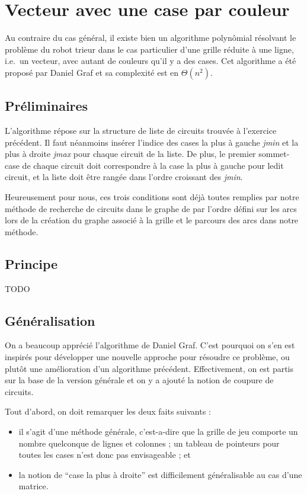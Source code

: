 \documentclass[12pt,a4paper]{article}
\begin{document}
\section{Vecteur avec une case par couleur}
Au contraire du cas g\'en\'eral, il existe bien un algorithme polyn\^omial r\'esolvant
le probl\`eme du robot trieur dans le cas particulier d'une grille r\'eduite \`a une
ligne, i.e.\ un vecteur, avec autant de couleurs qu'il y a des cases. Cet
algorithme a \'et\'e propos\'e par Daniel Graf et sa complexit\'e est en 
$\Theta(n^2)$.

\subsection*{Pr\'eliminaires}
L'algorithme r\'epose sur la structure de liste de circuits trouv\'ee \`a l'exercice
pr\'ec\'edent. Il faut n\'eanmoins ins\'erer l'indice des cases la plus \`a gauche
{\itshape jmin} et la plus \`a droite {\itshape jmax} pour chaque circuit de la liste.
De plus, le premier sommet-case de chaque circuit doit correspondre \`a la case la
plus \`a gauche pour ledit circuit, et la liste doit \^etre rang\'ee dans l'ordre
croissant des {\itshape jmin}.

Heureusement pour nous, ces trois conditions sont d\'ej\`a toutes remplies par
notre m\'ethode de recherche de circuits dans le graphe de par l'ordre d\'efini
sur les arcs lors de la cr\'eation du graphe associ\'e \`a la grille et le parcours
des arcs dans notre m\'ethode.

\subsection*{Principe}
TODO

\subsection*{G\'en\'eralisation}
On a beaucoup appr\'eci\'e l'algorithme de Daniel Graf. C'est pourquoi on s'en 
est inspir\'es pour d\'evelopper une nouvelle approche pour r\'esoudre ce 
probl\`eme, ou plut\^ot une am\'elioration d'un algorithme pr\'ec\'edent. 
Effectivement, on est partis sur la base de la version g\'en\'erale et on y a 
ajout\'e la notion de coupure de circuits.

Tout d'abord, on doit remarquer les deux faits suivants : 
\begin{itemize}
  \item il s'agit d'une m\'ethode g\'en\'erale, c'est-a-dire que la grille de 
jeu comporte un nombre quelconque de lignes et colonnes ; un tableau de 
pointeurs pour toutes les cases n'est donc pas envisageable ; et
\item la notion de \enquote{case la plus \`a droite} est difficilement 
g\'en\'eralisable au cas d'une matrice.
\end{itemize}
\end{document}
